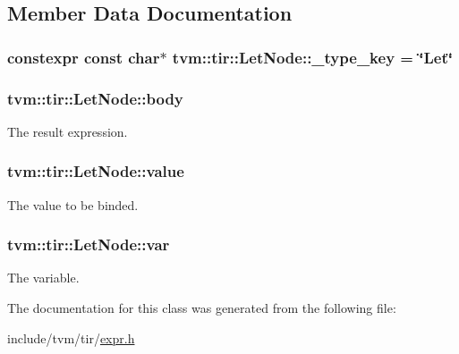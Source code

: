 \subsection{Member Data Documentation}
\subsubsection[{\texorpdfstring{\+\_\+type\+\_\+key}{_type_key}}]{\setlength{\rightskip}{0pt plus 5cm}constexpr const char$\ast$ tvm\+::tir\+::\+Let\+Node\+::\+\_\+type\+\_\+key = \char`\"{}Let\char`\"{}\hspace{0.3cm}{\ttfamily [static]}}\hypertarget{classtvm_1_1tir_1_1LetNode_a2f99e4a1bdf0c7832e9184a0746298b7}{}\label{classtvm_1_1tir_1_1LetNode_a2f99e4a1bdf0c7832e9184a0746298b7}
\subsubsection[{\texorpdfstring{body}{body}}]{ tvm\+::tir\+::\+Let\+Node\+::body}\hypertarget{classtvm_1_1tir_1_1LetNode_af5149b73b3b94ec379fcf879cc149338}{}\label{classtvm_1_1tir_1_1LetNode_af5149b73b3b94ec379fcf879cc149338}


The result expression. 

\subsubsection[{\texorpdfstring{value}{value}}]{ tvm\+::tir\+::\+Let\+Node\+::value}\hypertarget{classtvm_1_1tir_1_1LetNode_a6284cce4e601ca740b528f8f60aad0f9}{}\label{classtvm_1_1tir_1_1LetNode_a6284cce4e601ca740b528f8f60aad0f9}


The value to be binded. 

\subsubsection[{\texorpdfstring{var}{var}}]{ tvm\+::tir\+::\+Let\+Node\+::var}\hypertarget{classtvm_1_1tir_1_1LetNode_a21fdb9beb794933ee1094774ddfd2ee2}{}\label{classtvm_1_1tir_1_1LetNode_a21fdb9beb794933ee1094774ddfd2ee2}


The variable. 



The documentation for this class was generated from the following file\+:\begin{DoxyCompactItemize}
\item 
include/tvm/tir/\hyperlink{tir_2expr_8h}{expr.\+h}\end{DoxyCompactItemize}
